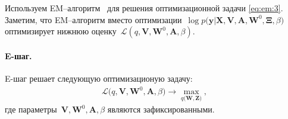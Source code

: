 Используем EM--алгоритм~\cite{Dempster1977, bishop2006} для решения оптимизационной задачи \eqref{eq:em:3}. Заметим, что EM--алгоритм вместо оптимизации~$\log p\bigr(\mathbf{y}|\mathbf{X}, \mathbf{V}, \textbf{A}, \textbf{W}^{0}, \bm{\Xi}, \beta\bigr)$ оптимизирует нижнюю оценку~$\mathcal{L}\left(q, \textbf{V}, \textbf{W}^{0}, \textbf{A}, \beta\right)$.


\paragraph{E-шаг.} E-шаг решает следующую оптимизационую задачу:
\[
\label{eq:em:new:3}
\begin{aligned}
\mathcal{L}\bigr(q, \textbf{V}, \textbf{W}^{0}, \textbf{A}, \beta\bigr) \to \max_{q\bigr(\textbf{W}, \textbf{Z}\bigr)},
\end{aligned}
\]
где параметры~$\textbf{V}, \textbf{W}^{0}, \textbf{A}, \beta$ являются зафиксированными.

